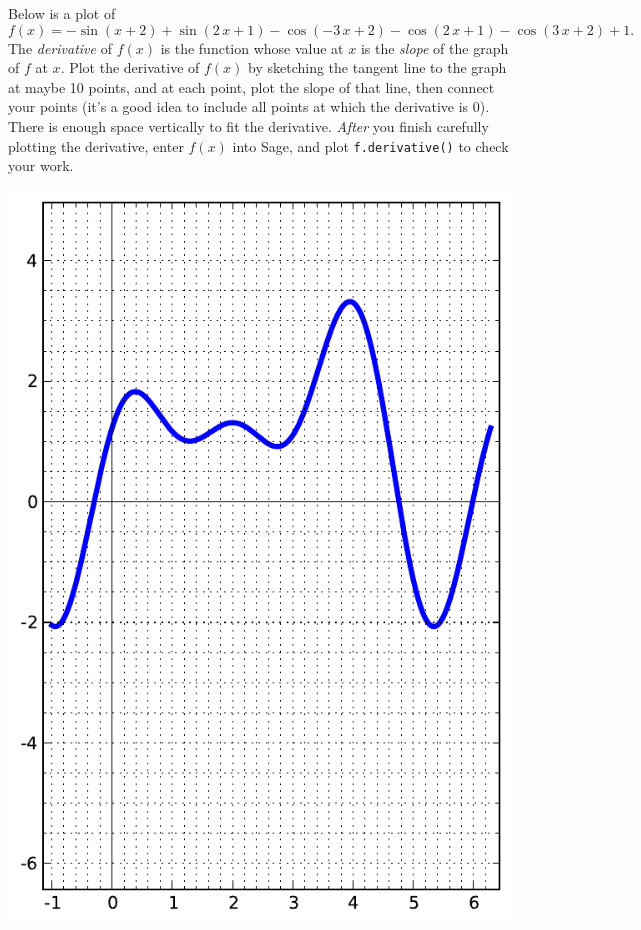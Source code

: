 Below is a plot of $$f(x)=-\sin\left(x + 2\right) + \sin\left(2 \, x + 1\right) - \cos\left(-3 \, x + 2\right) - \cos\left(2 \, x + 1\right) - \cos\left(3 \, x + 2\right) + 1.$$  The {\em \color{red}derivative} of $f(x)$ is the function whose value at $x$ is the {\em slope} of the graph of $f$ at $x$.  Plot the derivative of $f(x)$ by sketching the tangent line to the graph at maybe 10 points, and at each point, plot the slope of that line, then connect your points (it's a good idea to include all points at which the derivative is 0).  There is enough space vertically to fit the derivative.  {\em After} you finish carefully plotting the derivative, enter $f(x)$ into Sage, and plot {\color{blue}\verb|f.derivative()|} to check your work.
\begin{center}\includegraphics{functions/58.pdf}\end{center}\newpage

